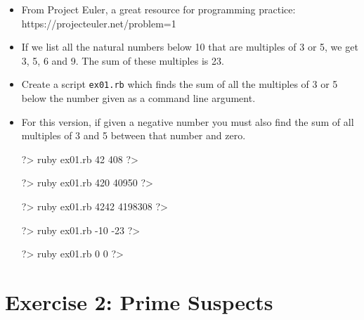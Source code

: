 \documentclass{42-en}
\begin{document}
\begin{itemize}

\item From Project Euler, a great resource for programming practice:\\
https://projecteuler.net/problem=1
\item If we list all the natural numbers below 10 that are multiples of 3 or 5, we get 3, 5, 6 and 9. The sum of these multiples is 23.
\item Create a script \texttt{ex01.rb} which finds the sum of all the multiples of 3 or 5 below the number given as a command line argument.
\item For this version, if given a negative number you must also find the sum of all multiples of 3 and 5 between that number and zero.

\begin{42console}
	?> ruby ex01.rb 42
	408
	?>
\end{42console}

\begin{42console}
	?> ruby ex01.rb 420
	40950
	?>
\end{42console}

\begin{42console}
	?> ruby ex01.rb 4242
	4198308
	?>
\end{42console}

\begin{42console}
	?> ruby ex01.rb -10
	-23
	?>
\end{42console}

\begin{42console}
	?> ruby ex01.rb 0
	0
	?>
\end{42console}

\end{itemize}


\chapter{Exercise 2: Prime Suspects}

\end{document}

